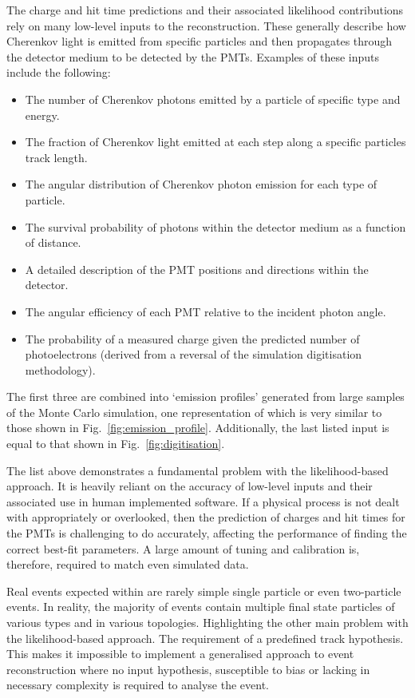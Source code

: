 The charge and hit time predictions and their associated likelihood contributions rely on many
low-level inputs to the reconstruction. These generally describe how Cherenkov light is emitted
from specific particles and then propagates through the detector medium to be detected by the
PMTs. Examples of these inputs include the following:
\begin{itemize}
    \item The number of Cherenkov photons emitted by a particle of specific type and energy.
    \item The fraction of Cherenkov light emitted at each step along a specific particles track
          length.
    \item The angular distribution of Cherenkov photon emission for each type of particle.
    \item The survival probability of photons within the detector medium as a function of
          distance.
    \item A detailed description of the PMT positions and directions within the detector.
    \item The angular efficiency of each PMT relative to the incident photon angle.
    \item The probability of a measured charge given the predicted number of photoelectrons
          (derived from a reversal of the simulation digitisation methodology).
\end{itemize}
The first three are combined into `emission profiles' generated from large samples of the Monte
Carlo simulation, one representation of which is very similar to those shown in
Fig.~\ref{fig:emission_profile}. Additionally, the last listed input is equal to that shown in
Fig.~\ref{fig:digitisation}.

The list above demonstrates a fundamental problem with the likelihood-based approach. It is
heavily reliant on the accuracy of low-level inputs and their associated use in human implemented
software. If a physical process is not dealt with appropriately or overlooked, then the prediction
of charges and hit times for the PMTs is challenging to do accurately, affecting the performance
of finding the correct best-fit parameters. A large amount of tuning and calibration is,
therefore, required to match even simulated data.

Real events expected within \chips are rarely simple single particle or even two-particle events.
In reality, the majority of events contain multiple final state particles of various types and in
various topologies. Highlighting the other main problem with the likelihood-based approach. The
requirement of a predefined track hypothesis. This makes it impossible to implement a generalised
approach to event reconstruction where no input hypothesis, susceptible to bias or lacking in
necessary complexity is required to analyse the event.

